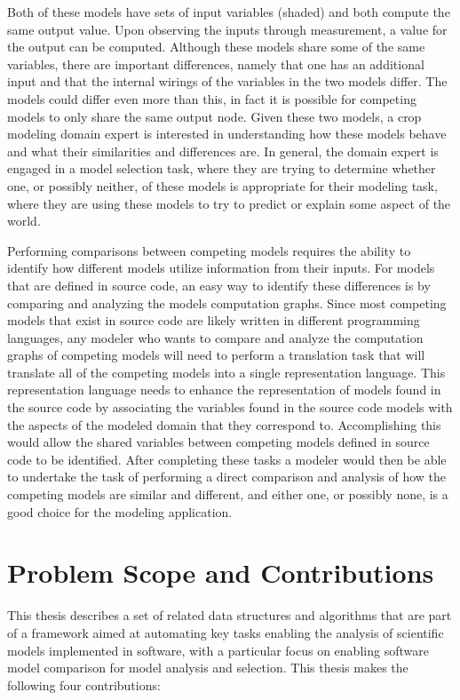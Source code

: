 Both of these models have sets of input variables (shaded) and both compute the same output value.
Upon observing the inputs through measurement, a value for the output can be computed.
Although these models share some of the same variables, there are important differences, namely that one has an additional input and that the internal wirings of the variables in the two models differ.
The models could differ even more than this, in fact it is possible for competing models to only share the same output node.
Given these two models, a crop modeling domain expert is interested in understanding how these models behave and what their similarities and differences are.
In general, the domain expert is engaged in a model selection task, where they are trying to determine whether one, or possibly neither, of these models is appropriate for their modeling task, where they are using these models to try to predict or explain some aspect of the world.

Performing comparisons between competing models requires the ability to identify how different models utilize information from their inputs.
For models that are defined in source code, an easy way to identify these differences is by comparing and analyzing the models computation graphs.
Since most competing models that exist in source code are likely written in different programming languages, any modeler who wants to compare and analyze the computation graphs of competing models will need to perform a translation task that will translate all of the competing models into a single representation language.
This representation language needs to enhance the representation of models found in the source code by associating the variables found in the source code models with the aspects of the modeled domain that they correspond to.
Accomplishing this would allow the shared variables between competing models defined in source code to be identified.
After completing these tasks a modeler would then be able to undertake the task of performing a direct comparison and analysis of how the competing models are similar and different, and either one, or possibly none, is a good choice for the modeling application.

\section{Problem Scope and Contributions\label{sec:prob_scope}}
This thesis describes a set of related data structures and algorithms that are part of a framework aimed at automating key tasks enabling the analysis of scientific models implemented in software, with a particular focus on enabling software model comparison for model analysis and selection. This thesis makes the following four contributions:

